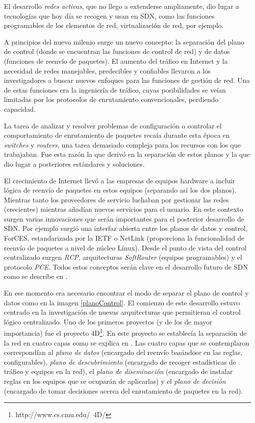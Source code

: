 \documentclass[a4paper,11pt]{book}
\begin{document}
El desarrollo \textit{redes activas}, que no llego a extenderse ampliamente, dio lugar a tecnologías que hoy día se recogen y usan en \ac{SDN}, como las funciones programables de los elementos de red, virtualización de red, por ejemplo.

A principios del nuevo milenio surge un nuevo concepto: la separación del plano de control (donde se encuentran las funciones de control de red) y de datos (funciones de reenvío de paquetes). El aumento del tráfico en Internet y la necesidad de redes manejables, predecibles y confiables llevaron a los investigadores a buscar nuevos enfoques para las funciones de gestión de red. Una de estas funciones era la ingeniería de tráfico, cuyas posibilidades se veían limitadas por los protocolos de enrutamiento convencionales, perdiendo capacidad.

La tarea de analizar y resolver problemas de configuración o controlar el comportamiento de enrutamiento de paquetes recaía durante esta época en \textit{switches} y \textit{routers}, una tarea demasiado compleja para los recursos con los que trabajaban. Fue esta razón la que derivó en la separación de estos planos y la que dio lugar a posteriores estándares y soluciones.

El crecimiento de Internet llevó a las empresas de equipos hardware a incluir lógica de reenvío de paquetes en estos equipos (separando así los dos planos). Mientras tanto los proveedores de servicio luchaban por gestionar las redes (crecientes) mientras añadían nuevos servicios para el usuario. En este contexto surgen varias innovaciones que serán importantes para el posterior desarrollo de \ac{SDN}. Por ejemplo surgió una interfaz abierta entre los planos de datos y control, \ac{ForCES}, estandarizada por la \ac{IETF} o NetLink (proporciona la funcionalidad de reenvío de paquetes a nivel de núcleo Línux). Desde el punto de vista del control centralizado surgen \textit{\ac{RCP}}, arquitecturas \textit{SoftRouter} (equipos programables) y el protocolo \textit{\ac{PCE}}. Todos estos conceptos serán clave en el desarrollo futuro de \ac{SDN} como se describe en \cite{feamster2013road}.

En ese momento era necesario encontrar el modo de separar el plano de control y datos como en la imagen \ref{planoControl}. El comienzo de este desarrollo estuvo centrado en la investigación de nuevas arquitecturas que permitieran el control lógico centralizado. Uno de los primeros proyectos (y de los de mayor importancia) fue el proyecto 4D\footnote{http://www.cs.cmu.edu/~4D/}. En este proyecto se establecía la separación de la red en cuatro capas como se explica en \cite{greenberg2005clean}. Las cuatro capas que se contemplaron correspondían al \textit{plano de datos} (encargado del reenvío basándose en las reglas, configurables), \textit{plano de descubrimiento} (encargado de recoger estadísticas de tráfico y equipos en la red), el \textit{plano de diseminación} (encargado de instalar reglas en los equipos que se ocuparán de aplicarlas) y el \textit{plano de decisión} (encargado de tomar decisiones acerca del enrutamiento de paquetes en la red).
\end{document}
